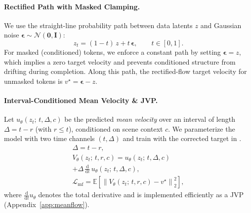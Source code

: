 \documentclass{article}
\theoremstyle{plain}
\theoremstyle{definition}
\theoremstyle{remark}
\begin{document}
\paragraph{Rectified Path with Masked Clamping.}
We use the straight-line probability path between data latents \(z\) and Gaussian noise \(\boldsymbol{\epsilon}\sim\mathcal{N}(\mathbf{0},\mathbf{I})\):
\begin{equation}
\label{eq:mf_path}
z_t = (1-t)\,z + t\,\boldsymbol{\epsilon},\qquad t\in[0,1].
\end{equation}
For masked (conditioned) tokens, we enforce a constant path by setting \(\boldsymbol{\epsilon}=z\),
which implies a zero target velocity and prevents conditioned structure from drifting during completion.
Along this path, the rectified-flow target velocity for unmasked tokens is \(v^\star = \boldsymbol{\epsilon} - z\).

\paragraph{Interval-Conditioned Mean Velocity \& JVP.}
Let \(u_\theta(z_t;\, \allowbreak t,\Delta,c)\) be the predicted \emph{mean velocity} over an interval of length \(\Delta=t-r\) (with \(r\le t\)),
conditioned on scene context \(c\).
We parameterize the model with two time channels \((t,\Delta)\) and train with the corrected target in .
\begin{equation}
\label{eq:mf_improved}
\begin{gathered}
\Delta = t-r, \\
V_\theta(z_t;\, t,r,c) = u_\theta(z_t;\, t,\Delta,c) \\
+ \Delta\, \frac{\mathrm{d}}{\mathrm{d}t}\,u_\theta(z_t;\, t,\Delta,c), \\
\mathcal{L}_{\mathrm{mf}} = \mathbb{E}\!\left[\left\lVert V_\theta(z_t;\, t,r,c)-v^\star\right\rVert_2^2\right],
\end{gathered}
\end{equation}
where \(\frac{\mathrm{d}}{\mathrm{d}t}u_\theta\) denotes the total derivative and is implemented efficiently as a JVP (Appendix~\ref{app:meanflow}).
\end{document}

